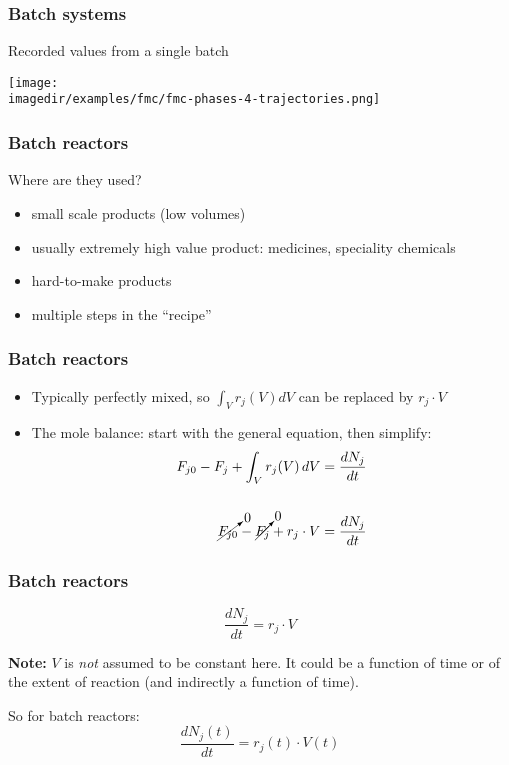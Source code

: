 \begin{frame}\frametitle{Batch systems}
	Recorded values from a single batch
	\begin{center}
		\texttt{[image: \\imagedir/examples/fmc/fmc-phases-4-trajectories.png]}
	\end{center}
	\vspace{-18pt}
\end{frame}

\begin{frame}\frametitle{Batch reactors}
	Where are they used?
	\begin{itemize}
		\item	small scale products (low volumes)
		\item	usually extremely high value product: medicines, speciality chemicals
		\item	hard-to-make products
		\item	multiple steps in the ``recipe''
	\end{itemize}
\end{frame}

\begin{frame}\frametitle{Batch reactors}
	\begin{itemize}
		\item	Typically perfectly mixed, so $\displaystyle \int_V r_j(V)dV$ can be replaced by $r_j \cdot V$
		\item	The mole balance: start with the general equation, then simplify:
		\[
			\begin{aligned}
				F_{j0} - F_j + \int_V r_j(V) \,dV &= \frac{dN_j}{dt}\\
				\\
				\cancelto{0}{F_{j0}} - \cancelto{0}{F_j} + r_j \cdot V        &= \frac{dN_j}{dt}\\
			\end{aligned}
		\]
	\end{itemize}
\end{frame}

\begin{frame}\frametitle{Batch reactors}
	$$\frac{dN_j}{dt} = r_j \cdot V$$ 
	
	\textbf{Note:} $V$ is \emph{not} assumed to be constant here. It could be a function of time or of the extent of reaction (and indirectly a function of time).
	\vspace{12pt}
	\begin{exampleblock}{So for batch reactors:}
		$$\frac{dN_j(t)}{dt} = r_j(t) \cdot V(t)$$
	\end{exampleblock}
\end{frame}


